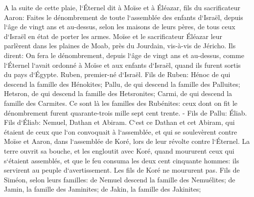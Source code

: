 \verse A la suite de cette plaie, l`Éternel dit à Moïse et à Éléazar, fils du sacrificateur Aaron: 
\verse Faites le dénombrement de toute l`assemblée des enfants d`Israël, depuis l`âge de vingt ans et au-dessus, selon les maisons de leurs pères, de tous ceux d`Israël en état de porter les armes. 
\verse Moïse et le sacrificateur Éléazar leur parlèrent dans les plaines de Moab, près du Jourdain, vis-à-vis de Jéricho. Ils dirent: 
\verse On fera le dénombrement, depuis l`âge de vingt ans et au-dessus, comme l`Éternel l`avait ordonné à Moïse et aux enfants d`Israël, quand ils furent sortis du pays d`Égypte. 
\verse Ruben, premier-né d`Israël. Fils de Ruben: Hénoc de qui descend la famille des Hénokites; Pallu, de qui descend la famille des Palluites; 
\verse Hetsron, de qui descend la famille des Hetsronites; Carmi, de qui descend la famille des Carmites. 
\verse Ce sont là les familles des Rubénites: ceux dont on fit le dénombrement furent quarante-trois mille sept cent trente. - 
\verse Fils de Pallu: Éliab. 
\verse Fils d`Éliab: Nemuel, Dathan et Abiram. C`est ce Dathan et cet Abiram, qui étaient de ceux que l`on convoquait à l`assemblée, et qui se soulevèrent contre Moïse et Aaron, dans l`assemblée de Koré, lors de leur révolte contre l`Éternel. 
\verse La terre ouvrit sa bouche, et les engloutit avec Koré, quand moururent ceux qui s`étaient assemblés, et que le feu consuma les deux cent cinquante hommes: ils servirent au peuple d`avertissement. 
\verse Les fils de Koré ne moururent pas. 
\verse Fils de Siméon, selon leurs familles: de Nemuel descend la famille des Nemuélites; de Jamin, la famille des Jaminites; de Jakin, la famille des Jakinites; 
